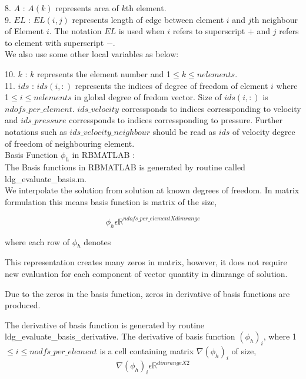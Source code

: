 \documentclass[a4paper,12pt]{book}
\begin{document}
8. $A$ : $A(k)$ represents area of $k$th element.\\

9. $EL$ : $EL(i,j)$ represents length of edge between element $i$ and $j$th neighbour of Element $i$. The notation $EL$ is used when $i$ refers to superscript $+$ and $j$ refers to element with superscript $-$.\\

We also use some other local variables as below:

10. $k$ : $k$ represents the element number and 1$\leq k \leq nelements$.\\

11. $ids$ : $ids(i,:)$ represents the indices of degree of freedom of element $i$ where 1$\leq i \leq nelements$ in global degree of fredom vector. Size of $ids(i,:)$ is $ndofs\_per\_element$. $ids\_velocity$ corressponds to indices corressponding to velocity and $ids\_pressure$ corressponds to indices corressponding to pressure. Further notations such as $ids\_velocity\_neighbour$ should be read as $ids$ of velocity degree of freedom of neighbouring element.\\

Basis Function $\phi_h$ in RBMATLAB :\\

The Basis functions in RBMATLAB is generated by routine called ldg\_evaluate\_basis.m.\\

We interpolate the solution from solution at known degrees of freedom. In matrix formulation this means basis function is matrix of the size,

\begin{equation}\label{basis_func_rbmatlab}
\phi_h \epsilon \mathbb{R}^{ndofs\_per\_element X dimrange}
\end{equation}

where each row of $\phi_h$ denotes 

This representation creates many zeros in matrix, however, it does not require new evaluation for each component of vector quantity in dimrange of solution.

Due to the zeros in the basis function, zeros in derivative of basis functions are produced. 

The derivative of basis function is generated by routine ldg\_evaluate\_basis\_derivative. The derivative of basis function $(\phi_h)_{i}$, where 1$\leq i \leq nodfs\_per\_element$ is a cell containing matrix $\nabla (\phi_h)_{i}$ of size,
\begin{equation}\label{basis_func_derivative_rbmatlab}
\nabla (\phi_h)_{i} \epsilon \mathbb{R}^{{dimrange} X 2}
\end{equation}
\end{document}
